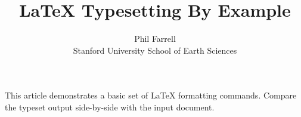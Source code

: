 \documentclass[11pt]{article}
\begin{document}
\title{LaTeX Typesetting By Example}
\author{Phil Farrell\\
Stanford University School of Earth Sciences}
\renewcommand{\today}{November 2, 1994}
\maketitle
This article demonstrates a basic set of LaTeX formatting commands.
Compare the typeset output side-by-side with the input document.
\end{document}
